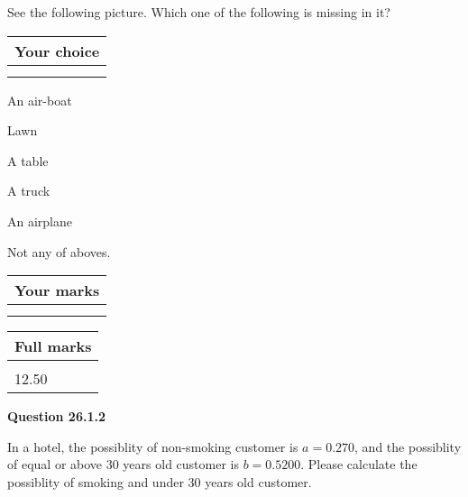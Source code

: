 \documentclass[12pt]{article}
\begin{document}
  
See the following picture.
Which one of the following is missing in it?
  
  
\noindent\hspace{3.0in} \begin{tabular}{|l|}
\hline
Your choice \\
\hline
 \\ 
 \\ 
\hline
\end{tabular}
  
  
 
 
An air-boat
 
 
Lawn
 
 
A table
 
 
A truck
 
 
An airplane
 
 
  Not any of aboves.
 
 
 
\vspace{0.3in}
  
\vspace{0.2in}
  
         \begin{tabular}{|l|}
\hline
 Your marks  \\
\hline
 \\ 
 \\ 
\hline
\end{tabular}
\hspace{0.05in} \begin{tabular}{|l|}
\hline
 Full marks  \\
\hline
 \\ 
12.50 \\
\hline
\end{tabular}
{\textbf{\Large{Question
26.1.2 
}}}
  
  
In a hotel, the possiblity of  %
non-smoking customer is
$a =  %
0.270$, and the possiblity of  %
equal or above 30 years old customer is $ b =  %
0.5200$.
Please calculate the possiblity of  %
smoking and  %
under 30 years old customer.
 

 

 
\vspace{0.3in}
  
\vspace{0.2in}
  
\end{document}
